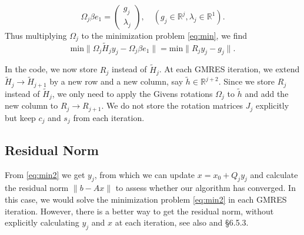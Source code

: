 \documentclass{article}
\newcommand{\norm}[1]{\lVert#1\rVert}
\begin{document}
\begin{equation*}
    \Omega_j \beta e_1 =
    \begin{pmatrix}
        g_j \\
        \lambda_j
    \end{pmatrix},
    \quad (g_j \in\mathbb{R}^{j}, \lambda_j \in\mathbb{R}^{1}).
\end{equation*}
Thus multiplying $\Omega_j$ to the minimization problem \eqref{eq:min}, we find
\begin{equation}
    \text{min}  \norm{ \Omega_j\tilde{H}_j y_j - \Omega_j\beta e_1 } = \text{min} \norm{R_j y_j - g_j}.
    \label{eq:min2} 
\end{equation}

In the code, we now store $R_j$ instead of $\tilde{H}_j$. At each GMRES iteration, we extend $\tilde{H}_j \rightarrow \tilde{H}_{j+1}$ by a new row and a new column, say $\tilde{h} \in \mathbb{R}^{j+2}$. Since we store $R_j$ instead of $\tilde{H}_j$, we only need to apply the Givens rotations $\Omega_j$ to $\tilde{h}$ and add the new column to $R_j \rightarrow R_{j+1}$. We do not store the rotation matrices $J_j$ explicitly but keep $c_j$ and $s_j$ from each iteration.

\subsection{Residual Norm}

From \eqref{eq:min2} we get $y_j$, from which we can update $x = x_0 + Q_j y_j$ and calculate the residual norm $\norm{b - A x}$ to assess whether our algorithm has converged. In this case, we would solve the minimization problem \eqref{eq:min2} in each GMRES iteration. However, there is a better way to get the residual norm, without explicitly calculating $y_j$ and $x$ at each iteration, see also \cite{Saad86} and \cite{Saad2003} \S 6.5.3.
\end{document}
